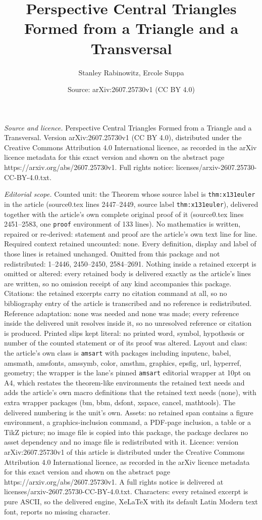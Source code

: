\documentclass[10pt,a4paper]{amsart}
\title[Perspective Central Triangles Formed from a Triangle and a T]{Perspective Central Triangles Formed from a Triangle and a Transversal}
\author{Stanley Rabinowitz, Ercole Suppa}
\date{Source: arXiv:2607.25730v1 (CC BY 4.0)}
\begin{document}
\maketitle

\noindent\emph{Source and licence.} Perspective Central Triangles Formed from a Triangle and a Transversal. Version arXiv:2607.25730v1 (CC BY 4.0), distributed under the Creative Commons Attribution 4.0 International licence, as recorded in the arXiv licence metadata for this exact version and shown on the abstract page https://arxiv.org/abs/2607.25730v1. Full rights notice: licenses/arxiv-2607.25730-CC-BY-4.0.txt.\par\smallskip

\noindent\textit{Editorial scope.} Counted unit: the Theorem whose source label is \texttt{thm:x131euler} in the article (source0.tex lines 2447--2449, source label \texttt{thm:x131euler}), delivered together with the article's own complete original proof of it (source0.tex lines 2451--2583, one \texttt{proof} environment of 133 lines). No mathematics is written, repaired or re-derived: statement and proof are the article's own text line for line. Required context retained uncounted: none. Every definition, display and label of those lines is retained unchanged. Omitted from this package and not redistributed: 1--2446, 2450--2450, 2584--2691. Nothing inside a retained excerpt is omitted or altered: every retained body is delivered exactly as the article's lines are written, so no omission receipt of any kind accompanies this package. Citations: the retained excerpts carry no citation command at all, so no bibliography entry of the article is transcribed and no reference is redistributed. Reference adaptation: none was needed and none was made; every reference inside the delivered unit resolves inside it, so no unresolved reference or citation is produced. Printed slips kept literal: no printed word, symbol, hypothesis or number of the counted statement or of its proof was altered. Layout and class: the article's own class is \texttt{amsart} with packages including inputenc, babel, amsmath, amsfonts, amssymb, color, amsthm, graphics, epsfig, url, hyperref, geometry; the wrapper is the lane's pinned \texttt{amsart} editorial wrapper at 10pt on A4, which restates the theorem-like environments the retained text needs and adds the article's own macro definitions that the retained text needs (none), with extra wrapper packages (bm, bbm, dsfont, xspace, cancel, mathtools). The delivered numbering is the unit's own. Assets: no retained span contains a figure environment, a graphics-inclusion command, a PDF-page inclusion, a table or a TikZ picture; no image file is copied into this package, the package declares no asset dependency and no image file is redistributed with it. Licence: version arXiv:2607.25730v1 of this article is distributed under the Creative Commons Attribution 4.0 International licence, as recorded in the arXiv licence metadata for this exact version and shown on the abstract page https://arxiv.org/abs/2607.25730v1. A full rights notice is delivered at licenses/arxiv-2607.25730-CC-BY-4.0.txt. Characters: every retained excerpt is pure ASCII, so the delivered engine, XeLaTeX with its default Latin Modern text font, reports no missing character.
\end{document}
